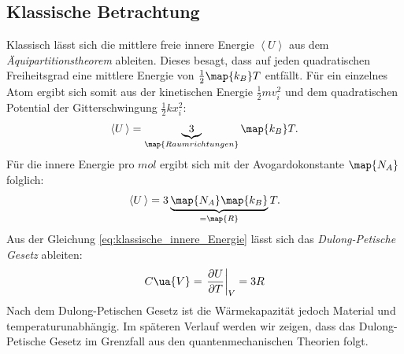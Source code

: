 \subsection{Klassische Betrachtung}
Klassisch lässt sich die mittlere freie innere Energie $\left<U\right>$ aus dem
\emph{Äquipartitionstheorem} ableiten. Dieses besagt, dass auf jeden quadratischen
Freiheitsgrad eine mittlere Energie von $\frac{1}{2}\map{k_B}T$ entfällt.
Für ein einzelnes Atom ergibt sich somit aus der kinetischen Energie $\frac{1}{2}mv_i^2$ und
dem quadratischen Potential der Gitterschwingung $\frac{1}{2}kx_i^2$:
\begin{equation}
  \label{eq:innere_Energie}
  \left<U\,\right> = \underbrace{3}_{\map{Raumrichtungen}}\map{k_B}T.
\end{equation}
Für die innere Energie pro $\si{mol}$ ergibt sich mit der Avogardokonstante
$\map{N_A}$ folglich:
\begin{equation}
  \label{eq:klassische_innere_Energie}
  \left<U\,\right> = 3\underbrace{\map{N_A} \map{k_B}}_{=\map{R}} T.
\end{equation}
Aus der Gleichung \eqref{eq:klassische_innere_Energie} lässt sich das
\emph{Dulong-Petische Gesetz} ableiten:
\begin{equation}
  \label{eq:dulong_petit}
  C\ua{V}=\left. \frac{\partial U}{\partial T}\right|_{V}=3R
\end{equation}
Nach dem Dulong-Petischen Gesetz ist die Wärmekapazität jedoch Material und
temperaturunabhängig. Im späteren Verlauf werden wir zeigen, dass das Dulong-Petische Gesetz
im Grenzfall aus den quantenmechanischen Theorien folgt.


